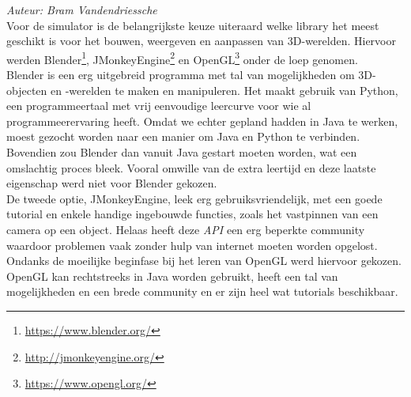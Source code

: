 {\em Auteur: Bram Vandendriessche}\\


\noindent
Voor de simulator is de belangrijkste keuze uiteraard welke library het meest geschikt is voor het bouwen, weergeven en aanpassen van 3D-werelden. Hiervoor werden Blender\footnote{\url{https://www.blender.org/}}, JMonkeyEngine\footnote{\url{http://jmonkeyengine.org/}} en OpenGL\footnote{\url{https://www.opengl.org/}} onder de loep genomen. 
\\
Blender is een erg uitgebreid programma met tal van mogelijkheden om 3D-objecten en -werelden te maken en manipuleren. Het maakt gebruik van Python, een programmeertaal met vrij eenvoudige leercurve voor wie al programmeerervaring heeft. Omdat we echter gepland hadden in Java te werken, moest gezocht worden naar een manier om Java en Python te verbinden. Bovendien zou Blender dan vanuit Java gestart moeten worden, wat een omslachtig proces bleek. Vooral omwille van de extra leertijd en deze laatste eigenschap werd niet voor Blender gekozen. \\
De tweede optie, JMonkeyEngine, leek erg gebruiksvriendelijk, met een goede tutorial en enkele handige ingebouwde functies, zoals het vastpinnen van een camera op een object. Helaas heeft deze \textit{API} een erg beperkte community waardoor problemen vaak zonder hulp van internet moeten worden opgelost. Ondanks de moeilijke beginfase bij het leren van OpenGL werd hiervoor gekozen. OpenGL kan rechtstreeks in Java worden gebruikt, heeft een tal van mogelijkheden en een brede community en er zijn heel wat tutorials beschikbaar. 


